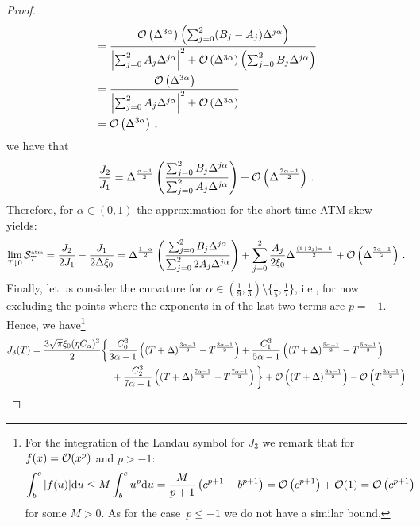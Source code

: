\begin{proof}
\begin{align*}
    &= \frac{\mathcal{O}\left(\Delta^{3\alpha}\right)\left(\sum_{j=0}^2 (B_j - A_j) \Delta^{j\alpha}\right)}{\left|\sum_{j=0}^2 A_j \Delta^{j\alpha}\right|^2 + \mathcal{O}\left(\Delta^{3\alpha}\right)\left(\sum_{j=0}^2 B_j \Delta^{j\alpha}\right)} \\
    &= \frac{\mathcal{O}\left(\Delta^{3\alpha}\right)}{\left|\sum_{j=0}^2 A_j \Delta^{j\alpha}\right|^2 + \mathcal{O}\left(\Delta^{3\alpha}\right)} \\
    & = \mathcal{O}\left(\Delta^{3\alpha}\right)\,,
\end{align*}
we have that
\begin{equation*}
    \frac{J_2}{J_1} = \Delta^{\frac{\alpha-1}2} \left(\frac{\sum_{j=0}^2 B_j \Delta^{j\alpha}}{\sum_{j=0}^2 A_j \Delta^{j\alpha}}\right) + \mathcal{O}\left(\Delta^{\frac{7\alpha - 1}{2}}\right)\,.
\end{equation*}
Therefore, for $\alpha\in(0,1)$ the approximation for the short-time ATM skew yields:  
\begin{align*}
    \lim _{T \downarrow 0} \mathcal{S}^{\textup{\tiny atm}}_T = \frac{J_2}{2J_1} - \frac{J_1}{2\Delta\xi_0} = \Delta^{\frac{1-\alpha}2} \left(\frac{\sum_{j=0}^2 B_j \Delta^{j\alpha}}{\sum_{j=0}^2 2A_j \Delta^{j\alpha}}\right) + \sum_{j=0}^2 \frac{A_j}{2\xi_0} \Delta^{\frac{(1+2j)\alpha-1}{2}} + \mathcal{O}\left(\Delta^{\frac{7\alpha - 1}{2}}\right)\,.
\end{align*}
Finally, let us consider the curvature for $\alpha\in\left(\frac{1}{9}, \frac{1}{3}\right)\setminus\{\frac15, \frac17\}$, i.e., for now excluding the points where the exponents in of the last two terms are $p=-1$. Hence, we have\footnote{For the integration of the Landau symbol for $J_3$ we remark that for $f(x)=\mathcal{O}(x^p)$ and $p > -1$:
$$\int_b^c|f(u)| \mathrm{d} u \leq M \int_b^c u^p \mathrm{d} u = \frac{M}{p+1}\left(c^{p+1}-b^{p+1}\right)=\mathcal{O}\left(c^{p+1}\right)+\mathcal{O}(1)=\mathcal{O}\left(c^{p+1}\right)$$
\indent for some $M>0$. As for the case~$p\leq -1$ we do not have a similar bound.}
\begin{align*}
     J_3(T) &= \frac{3\sqrt{\pi}\xi_0(\eta C_{\alpha})^3}{2} \bigg\{\frac{C_0^3}{3\alpha-1} \left( (T+\Delta)^{\frac{3\alpha - 1}{2}} - T^{\frac{3\alpha - 1}{2}} \right) + \frac{C_1^3}{5\alpha-1} \left( (T+\Delta)^{\frac{5\alpha - 1}{2}} - T^{\frac{5\alpha - 1}{2}} \right) \\
    & \hspace{3cm} + \frac{C_2^3}{7\alpha-1} \left( (T+\Delta)^{\frac{7\alpha - 1}{2}} - T^{\frac{7\alpha - 1}{2}} \right) \bigg\} + \Oo\left((T+\Delta)^{\frac{9\alpha - 1}{2}}\right)-\Oo\left(T^{\frac{9\alpha - 1}{2}}\right)
\end{align*}

\end{proof}
